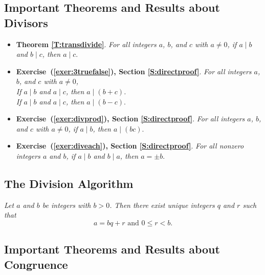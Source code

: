 \subsection*{Important Theorems and Results about Divisors} \label{SS:divisors}
%
\noindent
\begin{itemize}
\item \textbf{Theorem \ref{T:transdivide}}. \emph{For all integers $a$, $b$, and $c$ with 
$a \ne 0$, if $ a \mid b $ and $ b \mid c $, then $ a \mid c $}.

\item \textbf{Exercise~(\ref{exer:3truefalse}), Section \ref{S:directproof}}.  \emph{For all integers $a$, $b$, and $c$ with $a \ne 0$,  \\
If  $a \mid b$ and $a \mid c$, then $a \mid \left(b+c \right) $. \\
If  $a \mid b$ and $a \mid c$, then $a \mid \left(b-c \right) $}.

\item \textbf{Exercise~(\ref{exer:divprod}), Section \ref{S:directproof}}. \emph{For all integers $a$, $b$, and $c$ with $a \ne 0$, if $a \mid b$, then $a \mid \left( bc \right)$}.

\item \textbf{Exercise~(\ref{exer:diveach}), Section \ref{S:directproof}}.  \emph{For all nonzero integers $a$ and $b$, if $a \mid b$ and $b \mid a$, then $a = \pm b$}.
\end{itemize}
\hbreak


\subsection*{The Division Algorithm}
\emph{Let  $a$ and $b$ be integers with $b>0$.  Then there exist unique integers $q$ and $r$ such that}
\[
a=bq+r  \text{ and }  0 \leq r < b.
\]
\hbreak



\subsection*{Important Theorems and Results about Congruence} \label{SS:congruence}


